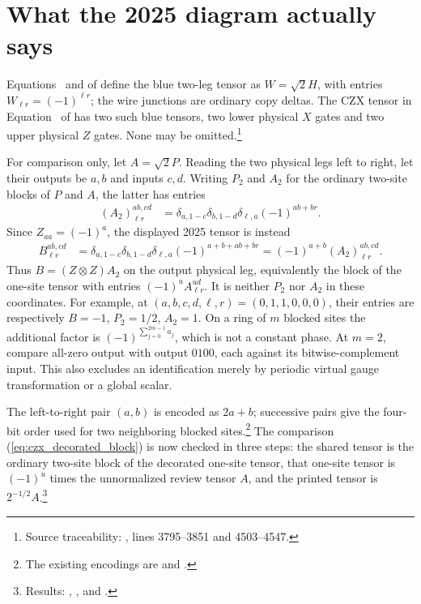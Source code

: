 \documentclass{article}
\begin{document}
\section{What the 2025 diagram actually says}
Equations~ and
 of \cite{FrancoRubio2025MPUGauging}
define the blue two-leg tensor as $W=\sqrt{2}H$, with entries
$W_{\ell r}=(-1)^{\ell r}$; the wire junctions are ordinary copy deltas.
The CZX tensor in Equation~ of
\cite{FrancoRubio2025MPUGauging} has two such blue tensors, two lower
physical $X$ gates and two upper physical $Z$ gates. None may be
omitted.\footnote{Source traceability: ,
    lines 3795--3851 and 4503--4547.}

For comparison only, let $A=\sqrt{2}P$. Reading the two physical legs
left to right, let their outputs be $a,b$ and inputs $c,d$.
Writing $P_2$ and $A_2$ for the ordinary two-site blocks of $P$ and $A$,
the latter has entries
\begin{align}
    (A_2)^{ab,cd}_{\ell r}
     & =\delta_{a,1-c}\delta_{b,1-d}\delta_{\ell,a}(-1)^{ab+br}.
    \label{eq:czx_repaired_block}
\end{align}
Since $Z_{aa}=(-1)^a$, the displayed 2025 tensor is instead
\begin{align}
    B^{ab,cd}_{\ell r}
     & =\delta_{a,1-c}\delta_{b,1-d}\delta_{\ell,a}(-1)^{a+b+ab+br}
    =(-1)^{a+b}(A_2)^{ab,cd}_{\ell r}.
    \label{eq:czx_decorated_block}
\end{align}
Thus $B=(Z\otimes Z)A_2$ on the output physical leg, equivalently the
block of the one-site tensor with entries $(-1)^u A^{ud}_{\ell r}$.
It is neither $P_2$ nor $A_2$ in these coordinates. For example, at
$(a,b,c,d,\ell,r)=(0,1,1,0,0,0)$, their entries are respectively
$B=-1$, $P_2=1/2$, $A_2=1$.
On a ring of $m$ blocked sites the additional factor is
$(-1)^{\sum_{j=0}^{2m-1}a_j}$, which is not a constant phase.
At $m=2$, compare all-zero output with output $0100$, each against its
bitwise-complement input. This also excludes an identification merely by
periodic virtual gauge transformation or a global scalar.

The left-to-right pair $(a,b)$ is encoded as $2a+b$; successive pairs
give the four-bit order used for two neighboring blocked sites.\footnote{The
    existing encodings are  and
    .}
The comparison (\ref{eq:czx_decorated_block}) is now checked in three
steps: the shared tensor is the ordinary two-site block of the decorated
one-site tensor, that one-site tensor is $(-1)^u$ times the unnormalized
review tensor $A$, and the printed tensor is $2^{-1/2}A$.\footnote{Results:
    ,
    ,
     and
    .}
\end{document}
